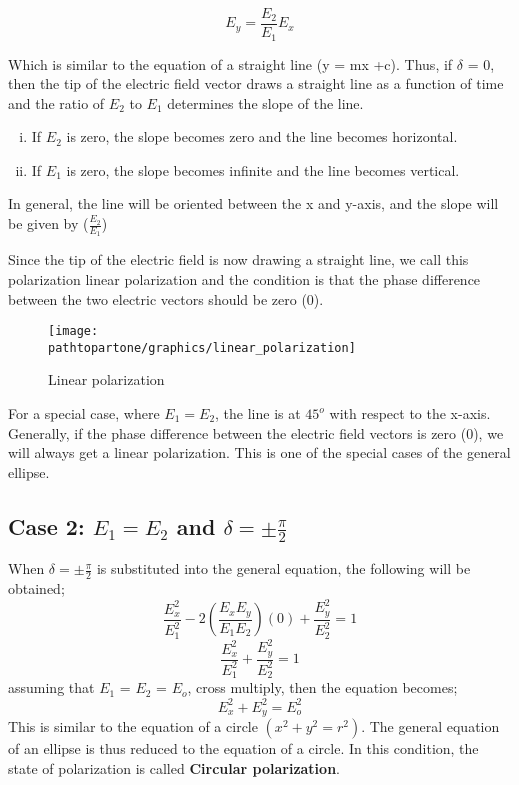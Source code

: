 \begin{equation}
E_y = \frac{E_2}{E_1}E_x
\end{equation}

Which is similar to the equation of a straight line (y = mx +c). Thus, if $\delta$ = 0, then the tip of the electric field vector draws a straight line as a function of time and the ratio of $ E_2 $ to $ E_1 $ determines the slope of the line.
\begin{enumerate}[(i)]
\item If $ E_2 $ is zero, the slope becomes zero and the line becomes horizontal.
\item If $ E_1 $ is zero, the slope becomes infinite and the line becomes vertical.
\end{enumerate} 
In general, the line will be oriented between the x and y-axis, and the slope will be given by ($\frac{E_2}{E_1}$)

Since the tip of the electric field is now drawing a straight line, we call this polarization linear polarization and the condition is that the phase difference between the two electric vectors should be zero (0).
\begin{figure}[h]
\centering
\texttt{[image: \\pathtopartone/graphics/linear\_polarization]}
\caption{Linear polarization}
\end{figure}

For a special case, where $  E_1=E_2 $, the line is at $ 45^{o}$ with respect to the x-axis. Generally, if the phase difference between the electric field vectors is zero (0), we will always get a linear polarization. This is one of the special cases of the general ellipse.

\subsection{Case 2: $ E_1 = E_2 $ and $\delta = \pm \frac{\pi}{2}$}
When $\delta = \pm \frac{\pi}{2}$ is substituted into the general equation, the following will be obtained;
\begin{equation}
\frac{E_{x}^2}{E_{1}^2} -2(\frac{E_{x}E_{y}}{E_{1}E_{2}})(0) + \frac{E_{y}^2}{E_{2}^2} = 1
\end{equation}
\begin{equation}
\frac{E_{x}^2}{E_{1}^2} + \frac{E_{y}^2}{E_{2}^2} = 1
\end{equation}
assuming that $ E_1 $ = $ E_2 $ = $ E_{o} $, cross multiply, then the equation becomes;
\begin{equation}
{E_{x}^2} + {E_{y}^2} = {E_{o}^2}
\end{equation}
This is similar to the equation of a circle $(x^2 + y^2 = r^2)$. The general equation of an ellipse is thus reduced to the equation of a circle. In this condition, the state of polarization is called \textbf{Circular polarization}.

